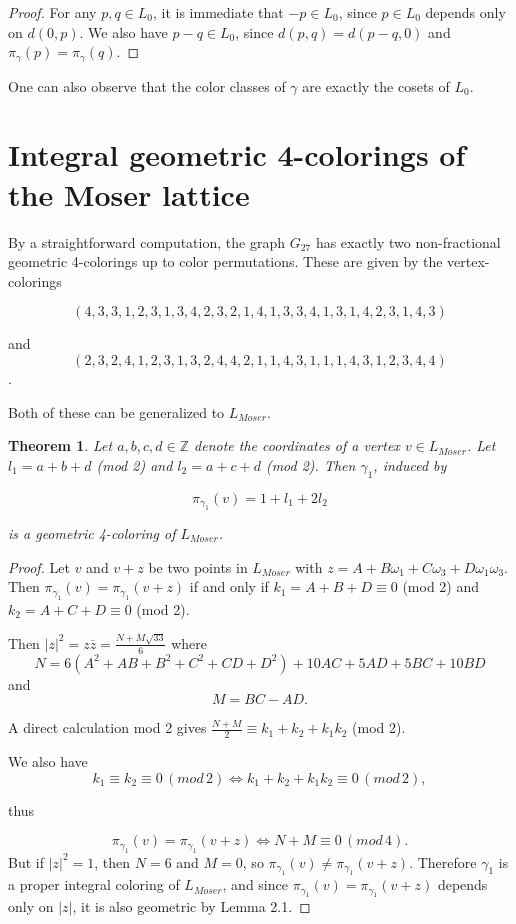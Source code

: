 \documentclass{article}
\newtheorem{theorem}{Theorem}[section]
\begin{document}
\begin{proof}
    For any $p, q \in L_0$, it is immediate that $-p \in L_0$, since $p\in L_0$ depends only on $d(0,p)$. We also have $p-q \in L_0$, since $d(p,q) = d(p-q, 0)$ and $\pi_\gamma(p) = \pi_\gamma(q)$.
\end{proof}

One can also observe that the color classes of $\gamma$ are exactly the cosets of $L_0$.
\newpage
\section{Integral geometric 4-colorings of the Moser lattice}

By a straightforward computation, the graph $G_{27}$ has exactly two non-fractional geometric 4-colorings up to color permutations. These are given by the vertex-colorings

\[(4, 3, 3, 1, 2, 3, 1, 3, 4, 2, 3, 2, 1, 4, 1, 3, 3, 4, 1, 3, 1, 4, 2, 3, 1, 4, 3)\]

and \[(2, 3, 2, 4, 1, 2, 3, 1, 3, 2, 4, 4, 2, 1, 1, 4, 3, 1, 1, 1, 4, 3, 1, 2, 3, 4, 4)\].

Both of these can be generalized to $L_{Moser}$.

\begin{theorem}

    Let $a,b,c,d \in \mathbb{Z}$ denote the coordinates of a vertex $v \in L_{Moser}$. Let $l_1 = a + b + d$ (mod 2) and $l_2 = a + c + d$ (mod 2). Then $\gamma_1$, induced by

    \[\pi_{\gamma_1}(v) = 1 + l_1 + 2l_2\]

    is a geometric 4-coloring of $L_{Moser}$.

\end{theorem}

\begin{proof}
    Let $v$ and $v+z$ be two points in $L_{Moser}$ with $z = A + B\omega_1 + C\omega_3 + D\omega_1\omega_3$. Then $\pi_{\gamma_1}(v) = \pi_{\gamma_1}(v+z)$ if and only if $k_1 = A + B + D \equiv 0$ (mod 2) and $k_2 = A + C + D \equiv 0$ (mod 2).

    Then $|z|^2 = z\overline{z} = \frac{N + M\sqrt{33}}{6}$ where \[
        N = 6(A^2+AB+B^2+C^2+CD+D^2)+10AC+5AD+5BC+10BD
    \]
    and \[
    M = BC-AD.
    \]
    
    A direct calculation mod 2 gives
        $\frac{N+M}{2} \equiv k_1 + k_2 + k_1k_2$ (mod 2). 
        
        We also have
        \[
            k_1\equiv k_2 \equiv0 \,(mod\,2) \iff k_1 + k_2 + k_1k_2 \equiv 0 \,(mod \, 2),
        \]
        
        thus

        \[
            \pi_{\gamma_1}(v) = \pi_{\gamma_1}(v+z) \iff N+M \equiv 0 \, (mod \, 4).
        \]
    But if $|z|^2 = 1$, then $N = 6$ and $M = 0$, so $\pi_{\gamma_1}(v) \not= \pi_{\gamma_1}(v+z)$. Therefore $\gamma_1$ is a proper integral coloring of $L_{Moser}$, and since $\pi_{\gamma_1}(v) = \pi_{\gamma_1}(v+z)$ depends only on $|z|$, it is also geometric by Lemma 2.1.

\end{proof}
\end{document}
